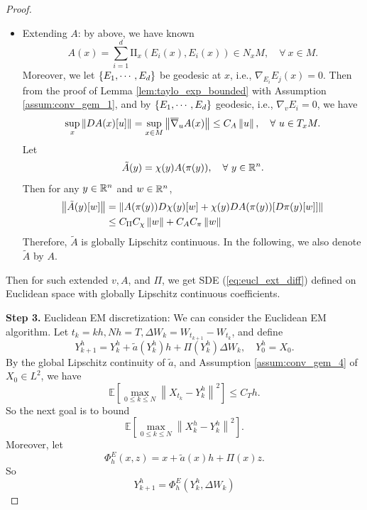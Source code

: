 \begin{proof}
\begin{itemize}
        \item Extending $A$: by above, we have known
        \begin{equation*}
            A(x) = \sum_{i = 1}^d \mathrm{II}_x(E_i(x),E_i(x)) \in N_xM,\quad \forall~ x \in M.
        \end{equation*}
        Moreover, we let $\left\{E_1,\cdots,E_d\right\}$ be geodesic at $x$, i.e., $\nabla_{E_i}E_j(x) = 0$. Then from the proof of Lemma \ref{lem:taylo_exp_bounded} with Assumption \ref{assum:conv_gem_1}, and by $\left\{E_1,\cdots,E_d\right\}$ geodesic, i.e., $\nabla_vE_i = 0$, we have
        \begin{equation*}
            \sup_x \left\lVert DA(x)[u]\right\lVert = \sup_{x \in M} \left\lVert\overline{\nabla}_u A(x)\right\lVert \leq C_A \left\lVert u\right\lVert,\quad \forall~ u\in T_xM.
        \end{equation*}
        Let
        \begin{equation*}
            \tilde{A}(y) = \chi(y) A(\pi(y)),\quad \forall ~ y \in \mathbb{R}^n.
        \end{equation*}
        Then for any $y \in \mathbb{R}^n$ and $w \in \mathbb{R}^n$,
        \begin{align*}
            \left\lVert\tilde{A}(y)[w]\right\lVert &= \left\lVert A(\pi(y))D\chi(y)[w] + \chi(y) D A(\pi(y))[D\pi(y)[w]]\right\lVert \\
            &\leq C_{\mathrm{II}}C_\chi \left\lVert w\right\lVert + C_AC_\pi \left\lVert w\right\lVert
        \end{align*}
        Therefore, $\tilde{A}$ is globally Lipschitz continuous. In the following, we also denote $\tilde{A}$ by $A$.
    \end{itemize}
    Then for such extended $v,A$, and $\Pi$, we get SDE (\ref{eq:eucl_ext_diff}) defined on Euclidean space with globally Lipschitz continuous coefficients.

    \vspace{0.5em}
    \textbf{Step 3.} Euclidean EM discretization: We can consider the Euclidean EM algorithm. Let $t_k=k h, N h=T, \Delta W_k=W_{t_{k+1}}-W_{t_k}$, and define
    \begin{equation*}
        Y_{k+1}^h=Y_k^h+\tilde{a}\left(Y_k^h\right) h+\Pi\left(Y_k^h\right) \Delta W_k, \quad Y_0^h=X_0.
    \end{equation*}
    By the global Lipschitz continuity of $\tilde{a}$, and Assumption \ref{assum:conv_gem_4} of $X_0 \in L^2$, we have
    \begin{equation*}
        \mathbb{E}\left[\max _{0 \leq k \leq N}\left\|X_{t_k}-Y_k^h\right\|^2\right] \leq C_T h.
    \end{equation*}
    So the next goal is to bound
    \begin{equation*}
        \mathbb{E}\left[\max _{0 \leq k \leq N}\left\|X_{k}^h-Y_k^h\right\|^2\right].
    \end{equation*}
    Moreover, let
    \begin{equation*}
        \Phi^E_h(x,z) = x + \tilde{a}(x)h + \Pi(x)z.
    \end{equation*}
    So
    \begin{equation*}
        Y_{k+1}^h = \Phi^E_h(Y_k^h,\Delta W_k)
    \end{equation*}
    

\end{proof}
